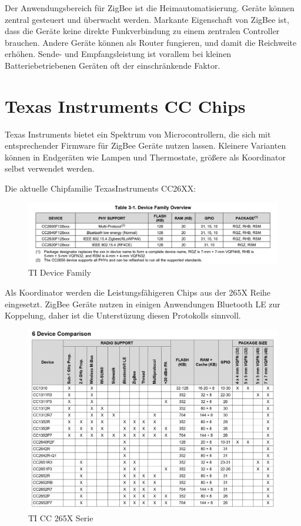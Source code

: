 Der Anwendungsbereich für ZigBee ist die Heimautomatisierung. Geräte können zentral gesteuert und überwacht werden. 
Markante Eigenschaft von ZigBee ist, dass die Geräte keine direkte Funkverbindung
zu einem zentralen Controller brauchen. Andere Geräte können als Router fungieren, und damit die Reichweite erhöhen. Sende- und Empfangsleistung
ist vorallem bei kleinen Batteriebetriebenen Geräten oft der einschränkende Faktor.


\section{Texas Instruments CC Chips}

Texas Instruments bietet ein Spektrum von Microcontrollern, die sich mit entsprechender Firmware für ZigBee Geräte 
nutzen lassen. Kleinere Varianten können in Endgeräten wie Lampen und Thermostate, größere als Koordinator selbst verwendet werden.

Die aktuelle Chipfamilie TexasInstruments CC26XX:

\begin{figure}[H]
  \centering
  \includegraphics[width=1\textwidth]{media/table26xx.png}
  \caption{TI Device Family}
\end{figure}

Als Koordinator werden die Leistungsfähigeren Chips aus der 265X Reihe eingesetzt. ZigBee Geräte nutzen in einigen
Anwendungen Bluetooth LE zur Koppelung, daher ist die Unterstüzung diesen Protokolls sinnvoll.

\begin{figure}[H]
  \centering
  \includegraphics[width=1\textwidth]{media/table265x.png}
  \caption{TI CC 265X Serie}
\end{figure}

